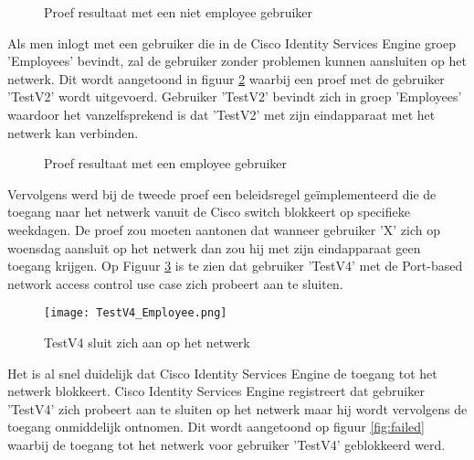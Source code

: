 \begin{figure}[H]
	\centering
	\qquad
	\newline
	\caption{Proef resultaat met een niet employee gebruiker}%
	\label{fig:Test_gebruiker}%
\end{figure}

Als men inlogt met een gebruiker die in de Cisco Identity Services Engine groep 'Employees' bevindt, zal de gebruiker zonder problemen kunnen aansluiten op het netwerk. Dit wordt aangetoond in figuur \ref{fig:Test_gebruiker} waarbij een proef met de gebruiker 'TestV2' wordt uitgevoerd. Gebruiker 'TestV2' bevindt zich in groep 'Employees' waardoor het vanzelfsprekend is dat 'TestV2' met zijn eindapparaat met het netwerk kan verbinden. 

\begin{figure}[H]
	\centering
	\qquad
	\newline
	\qquad
	\caption{Proef resultaat met een employee gebruiker}%
	\label{fig:Test_gebruiker}%
\end{figure}

Vervolgens werd bij de tweede proef een beleidsregel geïmplementeerd die de toegang naar het netwerk vanuit de Cisco switch blokkeert op specifieke weekdagen.  De proef zou moeten aantonen dat wanneer gebruiker 'X' zich op woensdag aansluit op het netwerk dan zou hij met zijn eindapparaat geen toegang krijgen.
Op Figuur \ref{fig:Woensdag} is te zien dat gebruiker 'TestV4' met de Port-based network access control use case zich probeert aan te sluiten. 

\begin{figure}[H]
	\centering
	\texttt{[image: TestV4\_Employee.png]}
	\caption{TestV4 sluit zich aan op het netwerk}
	\label{fig:Woensdag}
\end{figure}

Het is al snel duidelijk dat Cisco Identity Services Engine de toegang tot het netwerk blokkeert. Cisco Identity Services Engine registreert dat gebruiker 'TestV4' zich probeert aan te sluiten op het netwerk maar hij wordt vervolgens de toegang onmiddelijk ontnomen. Dit wordt aangetoond op figuur \ref{fig:failed} waarbij de toegang tot het netwerk voor gebruiker 'TestV4' geblokkeerd werd. 


